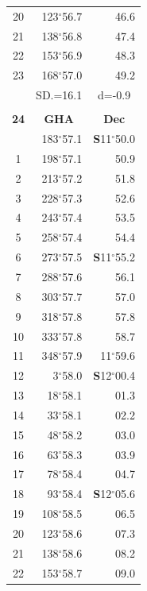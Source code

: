 \documentclass[10pt, a4paper]{report}
\begin{document}
\begin{scriptsize}
\begin{tabular*}{0.2\textwidth}[t]{@{\extracolsep{\fill}}|c|rr|}
20 & 123$^\circ$56.7 & 46.6\\
21 & 138$^\circ$56.8 & \raisebox{0.24ex}{\boldmath$\cdot$~\boldmath$\cdot$~~}47.4\\
22 & 153$^\circ$56.9 & 48.3\\
23 & 168$^\circ$57.0 & 49.2\\
\hline
\rule{0pt}{2.4ex} & \multicolumn{1}{c}{SD.=16.1} & \multicolumn{1}{c|}{d=-0.9}\\
\hline
\multicolumn{1}{c}{}\\[-0.5ex]\hline
\multicolumn{1}{|c|}{\rule{0pt}{2.6ex}\textbf{24}} & \multicolumn{1}{c}{\textbf{GHA}} & \multicolumn{1}{c|}{\textbf{Dec}}\\
\hline\rule{0pt}{2.6ex}\noindent
0 & 183$^\circ$57.1 & \textbf{S}11$^\circ$50.0\\
1 & 198$^\circ$57.1 & 50.9\\
2 & 213$^\circ$57.2 & 51.8\\
3 & 228$^\circ$57.3 & \raisebox{0.24ex}{\boldmath$\cdot$~\boldmath$\cdot$~~}52.6\\
4 & 243$^\circ$57.4 & 53.5\\
5 & 258$^\circ$57.4 & 54.4\\[2Pt]
6 & 273$^\circ$57.5 & \textbf{S}11$^\circ$55.2\\
7 & 288$^\circ$57.6 & 56.1\\
8 & 303$^\circ$57.7 & 57.0\\
9 & 318$^\circ$57.8 & \raisebox{0.24ex}{\boldmath$\cdot$~\boldmath$\cdot$~~}57.8\\
10 & 333$^\circ$57.8 & 58.7\\
11 & 348$^\circ$57.9 & 11$^\circ$59.6\\[2Pt]
12 & 3$^\circ$58.0 & \textbf{S}12$^\circ$00.4\\
13 & 18$^\circ$58.1 & 01.3\\
14 & 33$^\circ$58.1 & 02.2\\
15 & 48$^\circ$58.2 & \raisebox{0.24ex}{\boldmath$\cdot$~\boldmath$\cdot$~~}03.0\\
16 & 63$^\circ$58.3 & 03.9\\
17 & 78$^\circ$58.4 & 04.7\\[2Pt]
18 & 93$^\circ$58.4 & \textbf{S}12$^\circ$05.6\\
19 & 108$^\circ$58.5 & 06.5\\
20 & 123$^\circ$58.6 & 07.3\\
21 & 138$^\circ$58.6 & \raisebox{0.24ex}{\boldmath$\cdot$~\boldmath$\cdot$~~}08.2\\
22 & 153$^\circ$58.7 & 09.0\\

\end{tabular*}
\end{scriptsize}
\end{document}
